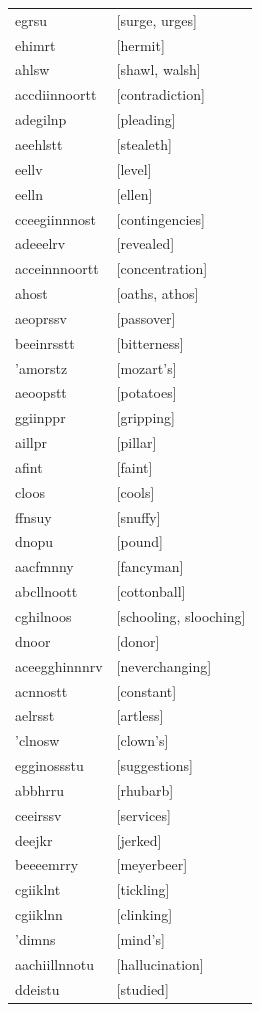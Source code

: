 \documentclass{article}
\begin{document}
\begin{tabular}{ll}
egrsu & [surge, urges] \\
ehimrt & [hermit] \\
ahlsw & [shawl, walsh] \\
accdiinnoortt & [contradiction] \\
adegilnp & [pleading] \\
aeehlstt & [stealeth] \\
eellv & [level] \\
eelln & [ellen] \\
cceegiinnnost & [contingencies] \\
adeeelrv & [revealed] \\
acceinnnoortt & [concentration] \\
ahost & [oaths, athos] \\
aeoprssv & [passover] \\
beeinrsstt & [bitterness] \\
'amorstz & [mozart's] \\
aeoopstt & [potatoes] \\
ggiinppr & [gripping] \\
aillpr & [pillar] \\
afint & [faint] \\
cloos & [cools] \\
ffnsuy & [snuffy] \\
dnopu & [pound] \\
aacfmnny & [fancyman] \\
abcllnoott & [cottonball] \\
cghilnoos & [schooling, slooching] \\
dnoor & [donor] \\
aceegghinnnrv & [neverchanging] \\
acnnostt & [constant] \\
aelrsst & [artless] \\
'clnosw & [clown's] \\
egginossstu & [suggestions] \\
abbhrru & [rhubarb] \\
ceeirssv & [services] \\
deejkr & [jerked] \\
beeeemrry & [meyerbeer] \\
cgiiklnt & [tickling] \\
cgiiklnn & [clinking] \\
'dimns & [mind's] \\
aachiillnnotu & [hallucination] \\
ddeistu & [studied] \\

\end{tabular}
\end{document}
